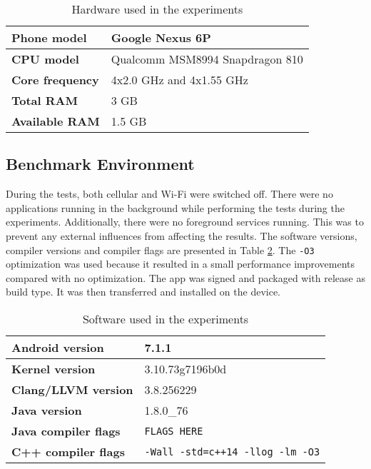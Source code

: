 \begin{table}[H]
    \centering
    \label{tab:hardware}
    \caption{Hardware used in the experiments}
    \begin{tabular}{|l|l|}
        \hline
        \textbf{Phone model} & Google Nexus 6P\\
        \hline
        \textbf{CPU model} & Qualcomm MSM8994 Snapdragon 810\\
        \hline
        \textbf{Core frequency} & 4x2.0 GHz and 4x1.55 GHz\\
        \hline
        \textbf{Total RAM} & 3 GB\\
        \hline
        \textbf{Available RAM} & 1.5 GB\\
        \hline
    \end{tabular}
\end{table}


\subsection{Benchmark Environment}
During the tests, both cellular and Wi-Fi were switched off. There were no applications running in the background while performing the tests during the experiments. Additionally, there were no foreground services running. This was to prevent any external influences from affecting the results. The software versions, compiler versions and compiler flags are presented in Table \ref{tab:software}. The \texttt{-O3} optimization was used because it resulted in a small performance improvements compared with no optimization. The app was signed and packaged with release as build type. It was then transferred and installed on the device.

\begin{table}[H]
    \centering
    \caption{Software used in the experiments}
    \begin{tabular}{|l|l|}
        \hline
        \textbf{Android version} & 7.1.1\\
        \hline
        \textbf{Kernel version} & 3.10.73g7196b0d\\
        \hline
        \textbf{Clang/LLVM version} & 3.8.256229\\
        \hline
        \textbf{Java version} & 1.8.0\_76\\
        \hline
        \textbf{Java compiler flags} & \texttt{FLAGS HERE}\\
        \hline
        \textbf{C++ compiler flags} & \texttt{-Wall -std=c++14 -llog -lm -O3}\\
        \hline
    \end{tabular}
    \label{tab:software}
\end{table}


